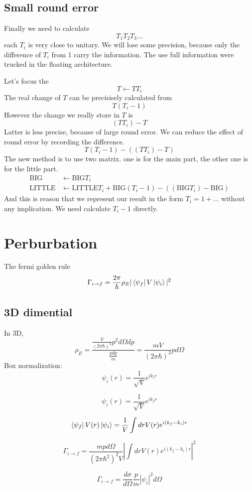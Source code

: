 \documentclass[12pt,twoside]{article}
\begin{document}
\subsection{Small round error}
Finally we need to calculate
$$
T_1 T_2 T_3 ...
$$
each $T_i$ is very close to unitary. We will lose some precision, because only the difference of $T_i$ from 1 carry the information. The use full information were trucked in the floating architecture.

Let's focus the 
$$
T \leftarrow T T_i
$$
The real change of $T$ can be precisisely calculated from
$$
T(T_i - 1)
$$
However the change we really store in $T$ is
$$
(T T_i) - T
$$
Latter is less precise, because of large round error. We can reduce the effect of round error by recording the difference. 
$$
T(T_i -1) - ((T T_i) - T)
$$
The new method is to use two matrix. one is for the main part, the other one is for the little part.
\begin{align}
\text{BIG} &\leftarrow \text{BIG} T_i\\
\text{LITTLE} &\leftarrow \text{LITTLE} T_i +  \text{BIG}(T_i -1) - ((\text{BIG} T_i) - \text{BIG})
\end{align}
And this is reason that we represent our result in the form $T_i = 1 + ...$ without any implication. We need calculate $T_i-1$ directly.

\section{Perburbation}

The fermi golden rule
$$
\Gamma_{i\rightarrow f} = \frac{2\pi}{\hbar} \rho_E |\bra{\psi_f}V\ket{\psi_i}|^2
$$

\subsection{3D dimential}

In 3D,
$$
\rho_E = \frac{
\frac{V}{(2\pi\hbar)^3}{ p^2 d\Omega dp}
}{
\frac{p dp}{m}
}
=
\frac{m V}{(2\pi\hbar)^3}{ p d\Omega}
$$
Box normalization:
$$
\psi_i(r) = \frac{1}{\sqrt{V}} e^{i k_i r}
$$

$$
\psi_i(r) = \frac{1}{\sqrt{V}} e^{i k_f r}
$$

$$
\bra{\psi_f} V(r) \ket{\psi_i} =  \frac{1}{V} \int dr V(r) e^{i(k_f - k_i) r}
$$

$$
\Gamma_{i\rightarrow f} = \frac{mp d\Omega}{(2\pi \hbar^2)^2 V} |\int dr V(r) e^{i(k_f - k_i) r}|^2
$$

$$
\Gamma_{i\rightarrow f} = \frac{d\sigma}{d\Omega} \frac{p}{m} |\psi_i|^2 d\Omega
$$
\end{document}
